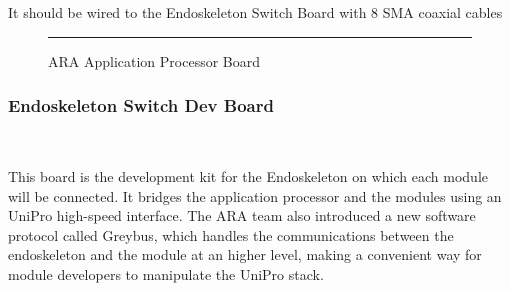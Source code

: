 It should be wired to the Endoskeleton Switch Board with 8 SMA coaxial cables

\begin{figure}[htbp]
  \centering
    \rule{35em}{0.5pt}
  \caption[ARA Application Processor Board]{ARA Application Processor Board}
  \label{fig:ap-board}
\end{figure}

\subsubsection{Endoskeleton Switch Dev Board}\

This board is the development kit for the Endoskeleton on which each module will be connected.
It bridges the application processor and the modules using an UniPro high-speed interface.
The ARA team also introduced a new software protocol called Greybus, which handles the communications between the endoskeleton and the module at an higher level, making a convenient way for module developers to manipulate the UniPro stack.

